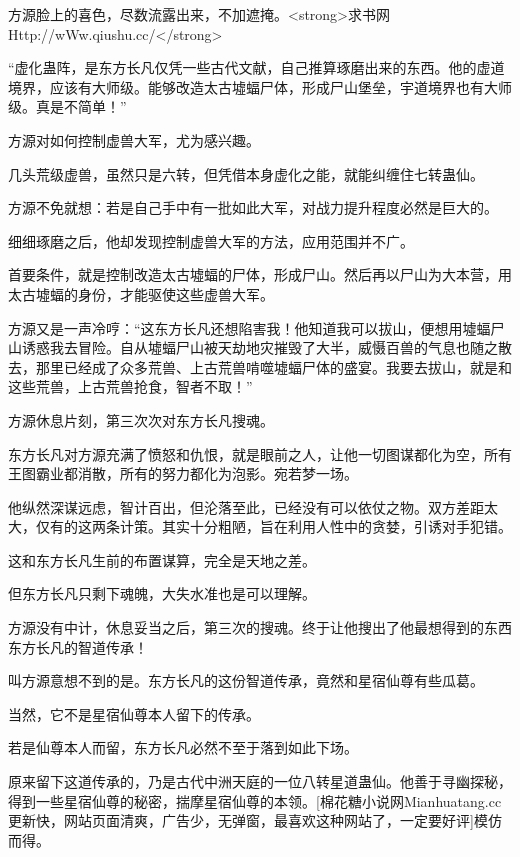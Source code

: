 
\begin{this_body}

方源脸上的喜色，尽数流露出来，不加遮掩。<strong>求书网Http://wWw.qiushu.cc/</strong>

“虚化蛊阵，是东方长凡仅凭一些古代文献，自己推算琢磨出来的东西。他的虚道境界，应该有大师级。能够改造太古墟蝠尸体，形成尸山堡垒，宇道境界也有大师级。真是不简单！”

方源对如何控制虚兽大军，尤为感兴趣。

几头荒级虚兽，虽然只是六转，但凭借本身虚化之能，就能纠缠住七转蛊仙。

方源不免就想：若是自己手中有一批如此大军，对战力提升程度必然是巨大的。

细细琢磨之后，他却发现控制虚兽大军的方法，应用范围并不广。

首要条件，就是控制改造太古墟蝠的尸体，形成尸山。然后再以尸山为大本营，用太古墟蝠的身份，才能驱使这些虚兽大军。

方源又是一声冷哼：“这东方长凡还想陷害我！他知道我可以拔山，便想用墟蝠尸山诱惑我去冒险。自从墟蝠尸山被天劫地灾摧毁了大半，威慑百兽的气息也随之散去，那里已经成了众多荒兽、上古荒兽啃噬墟蝠尸体的盛宴。我要去拔山，就是和这些荒兽，上古荒兽抢食，智者不取！”

方源休息片刻，第三次次对东方长凡搜魂。

东方长凡对方源充满了愤怒和仇恨，就是眼前之人，让他一切图谋都化为空，所有王图霸业都消散，所有的努力都化为泡影。宛若梦一场。

他纵然深谋远虑，智计百出，但沦落至此，已经没有可以依仗之物。双方差距太大，仅有的这两条计策。其实十分粗陋，旨在利用人性中的贪婪，引诱对手犯错。

这和东方长凡生前的布置谋算，完全是天地之差。

但东方长凡只剩下魂魄，大失水准也是可以理解。

方源没有中计，休息妥当之后，第三次的搜魂。终于让他搜出了他最想得到的东西东方长凡的智道传承！

叫方源意想不到的是。东方长凡的这份智道传承，竟然和星宿仙尊有些瓜葛。

当然，它不是星宿仙尊本人留下的传承。

若是仙尊本人而留，东方长凡必然不至于落到如此下场。

原来留下这道传承的，乃是古代中洲天庭的一位八转星道蛊仙。他善于寻幽探秘，得到一些星宿仙尊的秘密，揣摩星宿仙尊的本领。[棉花糖小说网Mianhuatang.cc更新快，网站页面清爽，广告少，无弹窗，最喜欢这种网站了，一定要好评]模仿而得。


\end{this_body}
